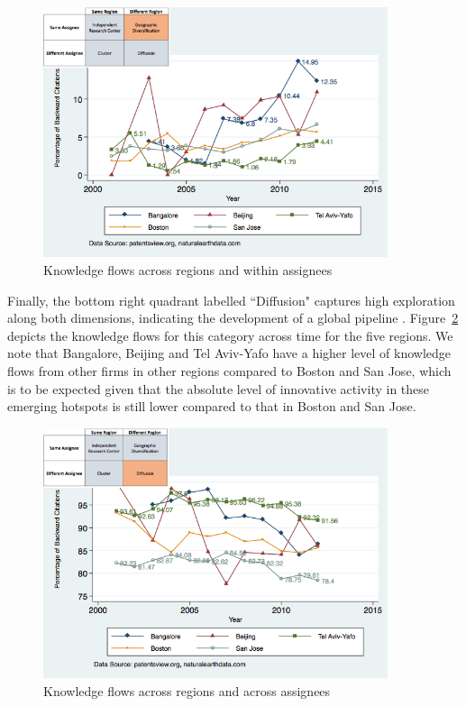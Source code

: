 \documentclass[12pt,letterpaper]{article}
\begin{document}
\begin{figure}[h!]
\begin{centering}
  \caption{Knowledge flows across regions and within assignees}
  \label{fig:SMSDiffRegionSameAssigneeFlows}
  \includegraphics[width=0.90\textwidth]{SMSDiffRegionSameAssigneeFlows}
\end{centering}
\end{figure}

Finally, the bottom right quadrant labelled ``Diffusion" captures high exploration along both dimensions, indicating the development of a global pipeline \citep*{Bathelt2004}. Figure~\ref{fig:SMSDiffRegionDiffAssigneeFlows} depicts the  knowledge flows for this category across time for the five regions. We note that Bangalore, Beijing and Tel Aviv-Yafo have a higher level of knowledge flows from other firms in other regions compared to Boston and San Jose, which is to be expected given that the absolute level of innovative activity in these emerging hotspots is still lower compared to that in Boston and San Jose. \par

\begin{figure}[h!]
\begin{centering}
  \caption{Knowledge flows across regions and across assignees}
  \label{fig:SMSDiffRegionDiffAssigneeFlows}
  \includegraphics[width=0.90\textwidth]{SMSDiffRegionDiffAssigneeFlows}
\end{centering}
\end{figure}
\end{document}

